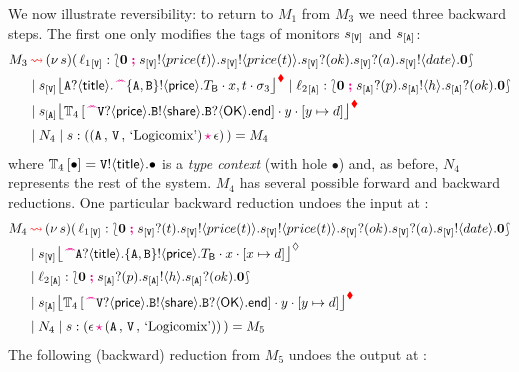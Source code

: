 \documentclass[runningheads,plain]{llncs}
\begin{document}
We now illustrate  reversibility: to return to $M_1$ from $M_3$ we need  three backward steps.
The first one only 
modifies the tags of monitors $\ep{s}{\pS}$ and $\ep{s}{\pA}$:
\begin{align*}
M_3 & \bk  \news{s}(\,  
\np{\key{{\loc_1}}{\pS}}{ \conf{\inact}{\bout{\epS}{price(t)}\bout{\epS}{price(t)}\binp{\epS}{ok}  \binp{\epS}{a} \bout{\epS}{date}\inact }} 
\\
& \Par 
 \monir{\ep{s}{\pS}}{\ltinp{A}{\mathsf{title}}{\past \ltout{\{A,B\}}{\mathsf{price}}{T_\mathsf{B}}}}{x,t}{\store_3} 
 \Par \np{\key{{\loc_2}}{\pA}}{ \conf{\inact}{\binp{\epA}{p}\bout{\epA}{h}\binp{\epA}{ok}\inact}} 
\\
& \Par 
\monir{\ep{s}{\pA}}{\myctxr{\ctx{T}_4}{\past \ltinp{\pS}{\mathsf{price}}{\ltout{B}{\mathsf{share}}{\ltinp{B}{\mathsf{OK}}{\lend}}}}}{y}{\upd{y}{d}} 
\\
& \Par N_4 \Par \codah{s}{\valueq{\pA}{\pS}{\exBook}}{\emp}{}~)  = M_4
\end{align*}
where 
$\myctxr{\ctx{T}_4}{\bullet}  =\ltout{\pS}{\mathsf{title}}{\bullet}$ is a  \emph{type context} (with hole $\bullet$) and, as before, $N_4$ represents the rest of the system.
$M_4$ has several possible forward and backward reductions. 
One particular backward reduction 
undoes the input at \pS:
\begin{align*}
M_4 & \bk  \news{s}(\,  
\np{\key{{\loc_1}}{\pS}}{ \conf{\inact}{\binp{\epS}{t}\bout{\epS}{price(t)}\bout{\epS}{price(t)}   \binp{\epS}{ok}\binp{\epS}{a} \bout{\epS}{date}\inact }} 
\\
& \Par 
 \hmoni{\ep{s}{\pS}}{\past \ltinp{A}{\mathsf{title}}{\ltout{\{A,B\}}{\mathsf{price}}{T_\mathsf{B}}}}{x}{\upd{x}{d}} 
\\
& \Par \np{\key{{\loc_2}}{\pA}}{ \conf{\inact}{\binp{\epA}{p}\bout{\epA}{h}\binp{\epA}{ok}\inact}} 
\\
& \Par 
\monir{\ep{s}{\pA}}{\myctxr{\ctx{T}_4}{\past \ltinp{\pS}{\mathsf{price}}{\ltout{B}{\mathsf{share}}{\ltinp{B}{\mathsf{OK}}{\lend}}}}}{y}{\upd{y}{d}} 
\\
& \Par N_4 \Par \codah{s}{\emp}{\valueq{\pA}{\pS}{\exBook}}{}~)  = M_5
\end{align*}
The following (backward) reduction from $M_5$ undoes the output at \pA:
\end{document}
